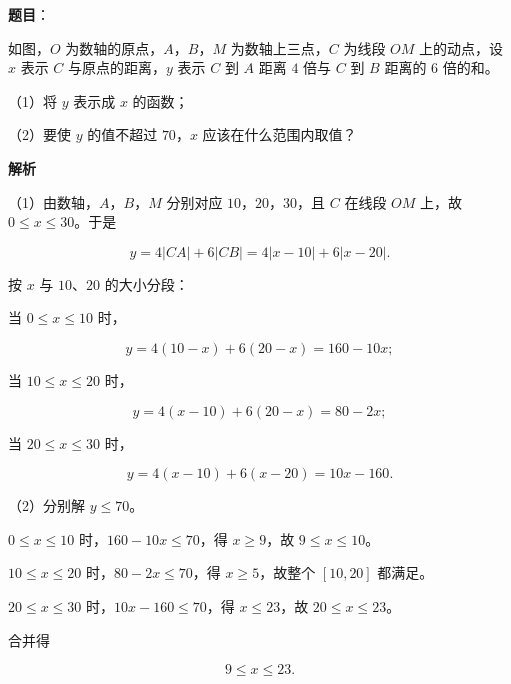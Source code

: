 \begin{answer}

\textbf{题目}：

如图，$O$ 为数轴的原点，$A$，$B$，$M$ 为数轴上三点，$C$ 为线段 $OM$ 上的动点，设 $x$ 表示 $C$ 与原点的距离，$y$ 表示 $C$ 到 $A$ 距离 $4$ 倍与 $C$ 到 $B$ 距离的 $6$ 倍的和。

（1）将 $y$ 表示成 $x$ 的函数；

（2）要使 $y$ 的值不超过 $70$，$x$ 应该在什么范围内取值？
\nopagebreak[4]
\begin{center}\end{center}
\nopagebreak[4]
\textbf{解析}

（1）由数轴，$A$，$B$，$M$ 分别对应 $10$，$20$，$30$，且 $C$ 在线段 $OM$ 上，故 $0\leqslant x\leqslant30$。于是

\nopagebreak[4]
\[y=4|CA|+6|CB|=4|x-10|+6|x-20| .\]

按 $x$ 与 $10$、$20$ 的大小分段：

当 $0\leqslant x\leqslant10$ 时，

\nopagebreak[4]
\[y=4(10-x)+6(20-x)=160-10x;\]

当 $10\leqslant x\leqslant20$ 时，

\nopagebreak[4]
\[y=4(x-10)+6(20-x)=80-2x;\]

当 $20\leqslant x\leqslant30$ 时，

\nopagebreak[4]
\[y=4(x-10)+6(x-20)=10x-160 .\]

（2）分别解 $y\leqslant70$。

$0\leqslant x\leqslant10$ 时，$160-10x\leqslant70$，得 $x\geqslant9$，故 $9\leqslant x\leqslant10$。

$10\leqslant x\leqslant20$ 时，$80-2x\leqslant70$，得 $x\geqslant5$，故整个 $[10,20]$ 都满足。

$20\leqslant x\leqslant30$ 时，$10x-160\leqslant70$，得 $x\leqslant23$，故 $20\leqslant x\leqslant23$。

合并得

\nopagebreak[4]
\[9\leqslant x\leqslant23 .\]


\end{answer}